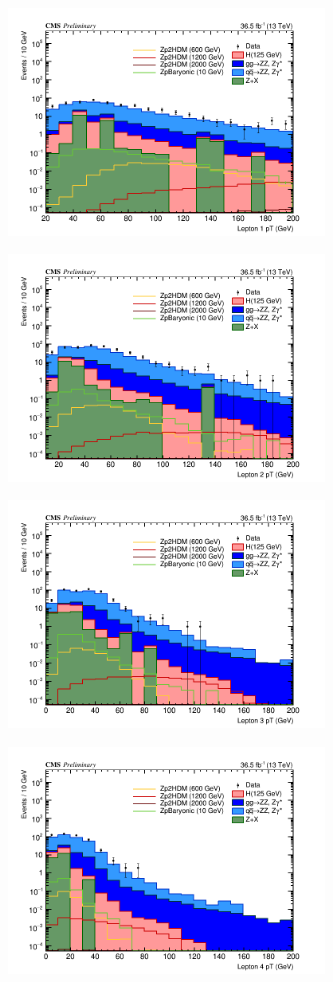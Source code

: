\begin{enumerate}
\begin{figure}[tbh]
\begin{subfigure}{0.50\textwidth}
\centering
\includegraphics[width=3.3in]{figures/hist_hPtLep1_5.png}
\caption{}
\end{subfigure}
\begin{subfigure}{0.50\textwidth}
\centering
\includegraphics[width=3.3in]{figures/hist_hPtLep2_5.png}
\caption{}
\end{subfigure}
\begin{subfigure}{0.50\textwidth}
\centering
\includegraphics[width=3.3in]{figures/hist_hPtLep3_5.png}
\caption{}
\end{subfigure}
\begin{subfigure}{0.50\textwidth}
\centering
\includegraphics[width=3.3in]{figures/hist_hPtLep4_5.png}

\end{subfigure}
\end{figure}
\end{enumerate}
